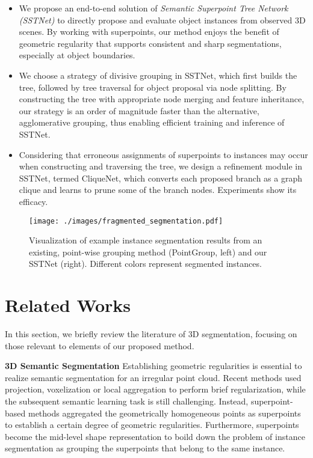 \documentclass[10pt,twocolumn,letterpaper]{article}
\begin{document}
\begin{itemize}
\item We propose an end-to-end solution of \emph{Semantic Superpoint Tree Network (SSTNet)} to directly propose and evaluate object instances from observed 3D scenes. By working with superpoints, our method enjoys the benefit of geometric regularity that supports consistent and sharp segmentations, especially at object boundaries.

\item We choose a strategy of divisive grouping in SSTNet, which first builds the tree, followed by tree traversal for object proposal via node splitting. By constructing the tree with appropriate node merging and feature inheritance, our strategy is an order of magnitude faster than the alternative, agglomerative grouping, thus enabling efficient training and inference of SSTNet.

\item Considering that erroneous assignments of superpoints to instances may occur when constructing and traversing the tree, we design a refinement module in SSTNet, termed CliqueNet, which converts each proposed branch as a graph clique and learns to prune some of the branch nodes. Experiments show its efficacy. 
\end{itemize}

\begin{figure}[htbp]
    \centering
    \texttt{[image: ./images/fragmented\_segmentation.pdf]}
    \caption{Visualization of example instance segmentation results from an existing, point-wise grouping method (PointGroup\cite{jiang2020pointgroup}, left) and our SSTNet (right). Different colors represent segmented instances.}
    \label{figFragmented}
\end{figure}

\section{Related Works}
\label{secRelatedWork}

In this section, we briefly review the literature of 3D segmentation, focusing on those relevant to elements of our proposed method.

\noindent\textbf{3D Semantic Segmentation}
Establishing geometric regularities is essential to realize semantic segmentation for an irregular point cloud.
Recent methods used projection\cite{lawin2017deep}, voxelization\cite{Graham_2018_CVPR, choy20194d} or local aggregation\cite{NIPS2017_d8bf84be, wang2019dynamic} to perform brief regularization, while the subsequent semantic learning task is still challenging.
Instead, superpoint-based\cite{landrieu2018large, landrieu2019point} methods aggregated the geometrically homogeneous points as superpoints to establish a certain degree of geometric regularities.
Furthermore, superpoints become the mid-level shape representation to boild down the problem of instance segmentation as grouping the superpoints that belong to the same instance.
\end{document}
